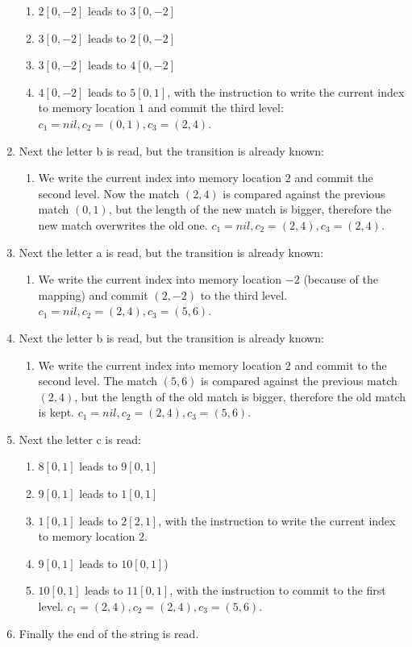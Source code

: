 \documentclass[english]{sigplanconf}
\theoremstyle{definition}
\begin{document}
\begin{enumerate}
\begin{enumerate}
\item $2[0,-2]$ leads to $3[0,-2]$
\item $3[0,-2]$ leads to $2[0,-2]$
\item $3[0,-2]$ leads to $4[0,-2]$
\item $4[0,-2]$ leads to $5[0,1]$, with the instruction to write the current
index to memory location $1$ and commit the third level: $c_{1}=nil,c_{2}=(0,1),c_{3}=(2,4)$.
\end{enumerate}
\item Next the letter b is read, but the transition is already known:

\begin{enumerate}
\item We write the current index into memory location $2$ and commit the
second level. Now the match $(2,4)$ is compared against the previous
match $(0,1)$, but the length of the new match is bigger, therefore
the new match overwrites the old one. $c_{1}=nil,c_{2}=(2,4),c_{3}=(2,4)$.
\end{enumerate}
\item Next the letter a is read, but the transition is already known:

\begin{enumerate}
\item We write the current index into memory location $-2$ (because of
the mapping) and commit $(2,-2)$ to the third level. $c_{1}=nil,c_{2}=(2,4),c_{3}=(5,6)$.
\end{enumerate}
\item Next the letter b is read, but the transition is already known:

\begin{enumerate}
\item We write the current index into memory location $2$ and commit to
the second level. The match $(5,6)$ is compared against the previous
match $(2,4)$, but the length of the old match is bigger, therefore
the old match is kept. $c_{1}=nil,c_{2}=(2,4),c_{3}=(5,6)$.
\end{enumerate}
\item Next the letter c is read:

\begin{enumerate}
\item $8[0,1]$ leads to $9[0,1]$
\item $9[0,1]$ leads to $1[0,1]$
\item $1[0,1]$ leads to $2[2,1]$, with the instruction to write the current
index to memory location $2$.
\item $9[0,1]$ leads to $10[0,1]$)
\item $10[0,1]$ leads to $11[0,1]$, with the instruction to commit to
the first level. $c_{1}=(2,4),c_{2}=(2,4),c_{3}=(5,6)$.
\end{enumerate}
\item Finally the end of the string is read.


\end{enumerate}
\end{document}
